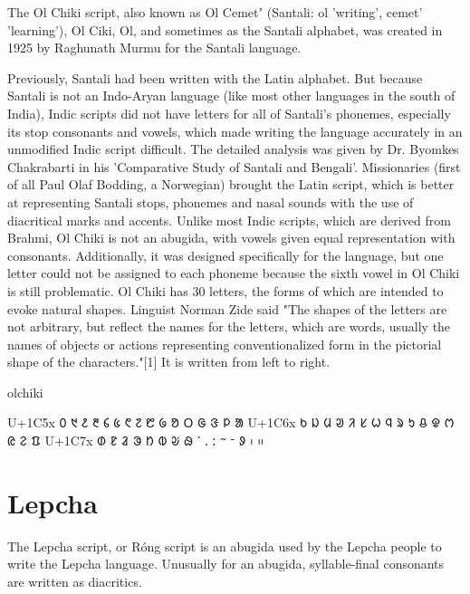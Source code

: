 The Ol Chiki script, also known as Ol Cemetʼ (Santali: ol 'writing', cemet' 'learning'), Ol Ciki, Ol, and sometimes as the Santali alphabet, was created in 1925 by Raghunath Murmu for the Santali language.

Previously, Santali had been written with the Latin alphabet. But because Santali is not an Indo-Aryan language (like most other languages in the south of India), Indic scripts did not have letters for all of Santali's phonemes, especially its stop consonants and vowels, which made writing the language accurately in an unmodified Indic script difficult. The detailed analysis was given by Dr. Byomkes Chakrabarti in his 'Comparative Study of Santali and Bengali'. Missionaries (first of all Paul Olaf Bodding, a Norwegian) brought the Latin script, which is better at representing Santali stops, phonemes and nasal sounds with the use of diacritical marks and accents. Unlike most Indic scripts, which are derived from Brahmi, Ol Chiki is not an abugida, with vowels given equal representation with consonants. Additionally, it was designed specifically for the language, but one letter could not be assigned to each phoneme because the sixth vowel in Ol Chiki is still problematic.
Ol Chiki has 30 letters, the forms of which are intended to evoke natural shapes. Linguist Norman Zide said "The shapes of the letters are not arbitrary, but reflect the names for the letters, which are words, usually the names of objects or actions representing conventionalized form in the pictorial shape of the characters."[1] It is written from left to right.

\newfontfamily{}

\begin{scriptexample}[]{olchiki}
\bgroup
\olchiki
\obeylines

U+1C5x 	᱐	᱑	᱒	᱓	᱔	᱕	᱖	᱗	᱘	᱙	ᱚ	ᱛ	ᱜ	ᱝ	ᱞ	ᱟ
U+1C6x	   ᱠ	ᱡ	ᱢ	ᱣ	ᱤ	ᱥ	ᱦ	ᱧ	ᱨ	ᱩ	ᱪ	ᱫ	ᱬ	ᱭ	ᱮ	ᱯ
U+1C7x  	ᱰ	ᱱ	ᱲ	ᱳ	ᱴ	ᱵ	ᱶ	ᱷ	ᱸ	ᱹ	ᱺ	ᱻ	ᱼ	ᱽ	᱾	᱿
\egroup

\end{scriptexample}

\section{Lepcha}
\newfontfamily{}

The Lepcha script, or Róng script is an abugida used by the Lepcha people to write the Lepcha language. Unusually for an abugida, syllable-final consonants are written as diacritics.

